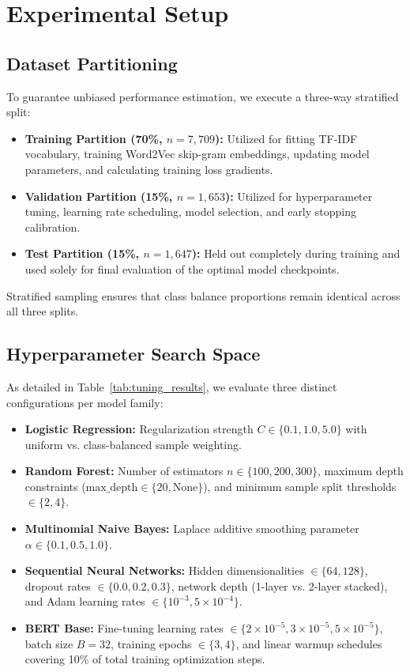 \documentclass[11pt,a4paper]{article}
\begin{document}
\section{Experimental Setup}
\label{sec:experiments}

\subsection{Dataset Partitioning}
To guarantee unbiased performance estimation, we execute a three-way stratified split:
\begin{itemize}
    \item \textbf{Training Partition (70\%, $n = 7,709$):} Utilized for fitting TF-IDF vocabulary, training Word2Vec skip-gram embeddings, updating model parameters, and calculating training loss gradients.
    \item \textbf{Validation Partition (15\%, $n = 1,653$):} Utilized for hyperparameter tuning, learning rate scheduling, model selection, and early stopping calibration.
    \item \textbf{Test Partition (15\%, $n = 1,647$):} Held out completely during training and used solely for final evaluation of the optimal model checkpoints.
\end{itemize}
Stratified sampling ensures that class balance proportions remain identical across all three splits.

\subsection{Hyperparameter Search Space}
As detailed in Table~\ref{tab:tuning_results}, we evaluate three distinct configurations per model family:
\begin{itemize}
    \item \textbf{Logistic Regression:} Regularization strength $C \in \{0.1, 1.0, 5.0\}$ with uniform vs. class-balanced sample weighting.
    \item \textbf{Random Forest:} Number of estimators $n \in \{100, 200, 300\}$, maximum depth constraints ($\text{max\_depth} \in \{20, \text{None}\}$), and minimum sample split thresholds $\in \{2, 4\}$.
    \item \textbf{Multinomial Naive Bayes:} Laplace additive smoothing parameter $\alpha \in \{0.1, 0.5, 1.0\}$.
    \item \textbf{Sequential Neural Networks:} Hidden dimensionalities $\in \{64, 128\}$, dropout rates $\in \{0.0, 0.2, 0.3\}$, network depth (1-layer vs. 2-layer stacked), and Adam learning rates $\in \{10^{-3}, 5\times 10^{-4}\}$.
    \item \textbf{BERT Base:} Fine-tuning learning rates $\in \{2\times 10^{-5}, 3\times 10^{-5}, 5\times 10^{-5}\}$, batch size $B=32$, training epochs $\in \{3, 4\}$, and linear warmup schedules covering 10\% of total training optimization steps.
\end{itemize}
\end{document}
